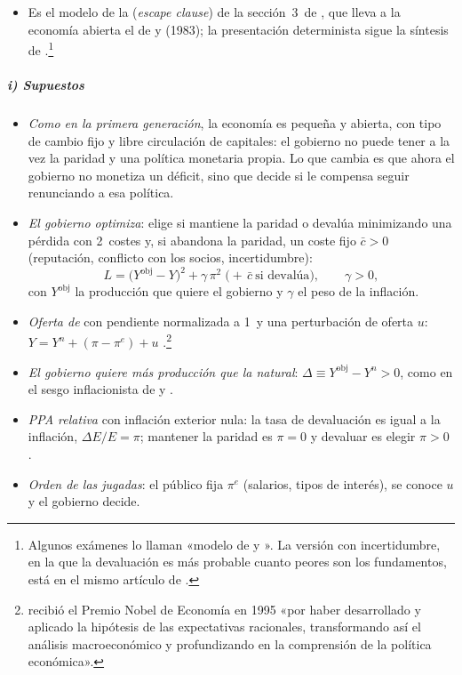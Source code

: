 \documentclass[11pt]{article}
\begin{document}
\begin{itemize}
\item Es el modelo de la  (\emph{escape clause}) de la sección~3~de \textcite{Obstfeld1996}, que lleva a la economía abierta el de  y  (1983)\nocite{Obstfeld1994Logic}; la presentación determinista sigue la síntesis de \textcite{Jeanne2000Currency}.\footnote{Algunos exámenes lo llaman «modelo de  y ». La versión con incertidumbre, en la que la devaluación es más probable cuanto peores son los fundamentos, está en el mismo artículo de .}
\end{itemize}

\subparagraph{i) Supuestos}

\begin{itemize}
\item \emph{Como en la primera generación}, la economía es pequeña y abierta, con tipo de cambio fijo y libre circulación de capitales: el gobierno no puede tener a la vez la paridad y una política monetaria propia. Lo que cambia es que ahora el gobierno no monetiza un déficit, sino que decide si le compensa seguir renunciando a esa política.
\item \emph{El gobierno optimiza}: elige si mantiene la paridad o devalúa minimizando una pérdida con 2~costes y, si abandona la paridad, un coste fijo $\bar c>0$ (reputación, conflicto con los socios, incertidumbre):
  \begin{equation}\label{eq:perdida-segunda}
  L=\bigl(Y^{\mathrm{obj}}-Y\bigr)^2+\gamma\,\pi^2\;\bigl(+\,\bar c\ \text{si devalúa}\bigr),\qquad \gamma>0 ,
  \end{equation}
  con $Y^{\mathrm{obj}}$ la producción que quiere el gobierno y $\gamma$ el peso de la inflación.
\item \emph{Oferta de } con pendiente normalizada a 1~y una perturbación de oferta $u$: $Y=Y^n+(\pi-\pi^e)+u$ .\footnote{ recibió el Premio Nobel de Economía en 1995 «por haber desarrollado y aplicado la hipótesis de las expectativas racionales, transformando así el análisis macroeconómico y profundizando en la comprensión de la política económica»\nocite{Nobel1995Lucas}.}
\item \emph{El gobierno quiere más producción que la natural}: $\Delta\equiv Y^{\mathrm{obj}}-Y^n>0$, como en el sesgo inflacionista de  y  .
\item \emph{PPA relativa} con inflación exterior nula: la tasa de devaluación es igual a la inflación, $\Delta E/E=\pi$; mantener la paridad es $\pi=0$ y devaluar es elegir $\pi>0$ .
\item \emph{Orden de las jugadas}: el público fija $\pi^e$ (salarios, tipos de interés), se conoce $u$ y el gobierno decide.
\end{itemize}
\end{document}
